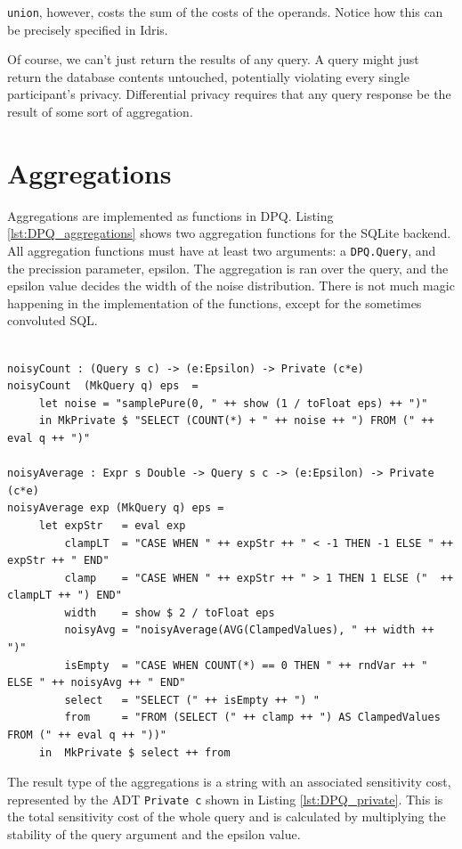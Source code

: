 \documentclass[12pt]{report}
\begin{document}
\texttt{union}, however, costs the sum of the costs of the operands.
Notice how this can be precisely specified in Idris.

Of course, we can't just return the results of any query.
A query might just return the database contents untouched, potentially violating every single participant's privacy.
Differential privacy requires that any query response be the result of some sort of aggregation.

\section{Aggregations}

Aggregations are implemented as functions in DPQ.
Listing \ref{lst:DPQ_aggregations} shows two aggregation functions for the SQLite backend.
All aggregation functions must have at least two arguments: a \texttt{DPQ.Query}, and the precission parameter, epsilon.
The aggregation is ran over the query, and the epsilon value decides the width of the noise distribution.
There is not much magic happening in the implementation of the functions, except for the sometimes convoluted SQL.

\begin{lstlisting}[caption={Noisy aggregations}, label={lst:DPQ_aggregations}]

noisyCount : (Query s c) -> (e:Epsilon) -> Private (c*e)
noisyCount  (MkQuery q) eps  =
     let noise = "samplePure(0, " ++ show (1 / toFloat eps) ++ ")"
     in MkPrivate $ "SELECT (COUNT(*) + " ++ noise ++ ") FROM (" ++ eval q ++ ")"

noisyAverage : Expr s Double -> Query s c -> (e:Epsilon) -> Private (c*e)
noisyAverage exp (MkQuery q) eps =
     let expStr   = eval exp
         clampLT  = "CASE WHEN " ++ expStr ++ " < -1 THEN -1 ELSE " ++ expStr ++ " END"
         clamp    = "CASE WHEN " ++ expStr ++ " > 1 THEN 1 ELSE ("  ++ clampLT ++ ") END"
         width    = show $ 2 / toFloat eps
         noisyAvg = "noisyAverage(AVG(ClampedValues), " ++ width ++ ")"
         isEmpty  = "CASE WHEN COUNT(*) == 0 THEN " ++ rndVar ++ " ELSE " ++ noisyAvg ++ " END"
         select   = "SELECT (" ++ isEmpty ++ ") "
         from     = "FROM (SELECT (" ++ clamp ++ ") AS ClampedValues FROM (" ++ eval q ++ "))"
     in  MkPrivate $ select ++ from

\end{lstlisting}

The result type of the aggregations is a string with an associated sensitivity cost, represented by the ADT \texttt{Private c} shown in Listing \ref{lst:DPQ_private}.
This is the total sensitivity cost of the whole query and is calculated by multiplying the stability of the query argument and the epsilon value.
\end{document}
